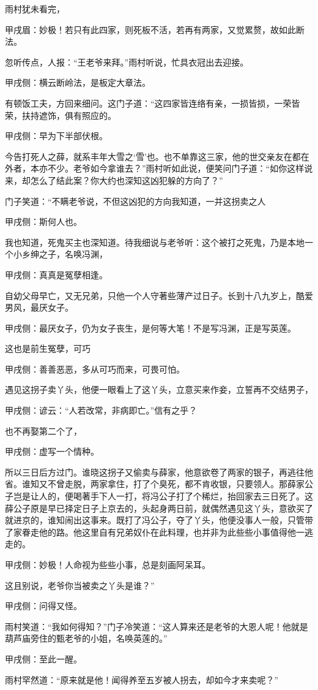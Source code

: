 \begin{parag}
    雨村犹未看完，\begin{note}甲戌眉：妙极！若只有此四家，则死板不活，若再有两家，又觉累赘，故如此断法。\end{note}忽听传点，人报：“王老爷来拜。”雨村听说，忙具衣冠出去迎接。\begin{note}甲戌侧：横云断岭法，是板定大章法。\end{note}有顿饭工夫，方回来细问。这门子道：“这四家皆连络有亲，一损皆损，一荣皆荣，扶持遮饰，俱有照应的。\begin{note}甲戌侧：早为下半部伏根。\end{note}今告打死人之薛，就系丰年大雪之‘雪’也。也不单靠这三家，他的世交亲友在都在外者，本亦不少。老爷如今拿谁去？”雨村听如此说，便笑问门子道：“如你这样说来，却怎么了结此案？你大约也深知这凶犯躲的方向了？”
\end{parag}


\begin{parag}
    门子笑道：“不瞒老爷说，不但这凶犯的方向我知道，一并这拐卖之人\begin{note}甲戌侧：斯何人也。\end{note}我也知道，死鬼买主也深知道。待我细说与老爷听：这个被打之死鬼，乃是本地一个小乡绅之子，名唤冯渊，\begin{note}甲戌侧：真真是冤孽相逢。\end{note}自幼父母早亡，又无兄弟，只他一个人守著些薄产过日子。长到十八九岁上，酷爱男风，最厌女子。\begin{note}甲戌侧：最厌女子，仍为女子丧生，是何等大笔！不是写冯渊，正是写英莲。\end{note}这也是前生冤孽，可巧\begin{note}甲戌侧：善善恶恶，多从可巧而来，可畏可怕。\end{note}遇见这拐子卖丫头，他便一眼看上了这丫头，立意买来作妾，立誓再不交结男子，\begin{note}甲戌侧：谚云：“人若改常，非病即亡。”信有之乎？\end{note}也不再娶第二个了，\begin{note}甲戌侧：虚写一个情种。\end{note}所以三日后方过门。谁晓这拐子又偷卖与薛家，他意欲卷了两家的银子，再逃往他省。谁知又不曾走脱，两家拿住，打了个臭死，都不肯收银，只要领人。那薛家公子岂是让人的，便喝著手下人一打，将冯公子打了个稀烂，抬回家去三日死了。这薛公子原是早已择定日子上京去的，头起身两日前，就偶然遇见这丫头，意欲买了就进京的，谁知闹出这事来。既打了冯公子，夺了丫头，他便没事人一般，只管带了家眷走他的路。他这里自有兄弟奴仆在此料理，也并非为此些些小事值得他一逃走的。\begin{note}甲戌侧：妙极！人命视为些些小事，总是刻画阿呆耳。\end{note}这且别说，老爷你当被卖之丫头是谁？”\begin{note}甲戌侧：问得又怪。\end{note}雨村笑道：“我如何得知？”门子冷笑道：“这人算来还是老爷的大恩人呢！他就是葫芦庙旁住的甄老爷的小姐，名唤英莲的。”\begin{note}甲戌侧：至此一醒。\end{note}雨村罕然道：“原来就是他！闻得养至五岁被人拐去，却如今才来卖呢？”
\end{parag}



